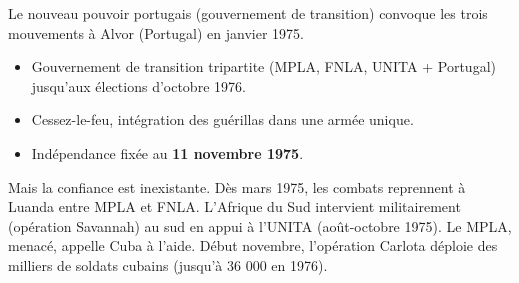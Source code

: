 \documentclass[11pt]{article}
\newcommand{\cle}[1]{{\popxbold\color{popdark}#1}}
\begin{document}
Le nouveau pouvoir portugais (gouvernement de transition) convoque les trois mouvements à \cle{Alvor} (Portugal) en janvier 1975.

\begin{propriete}
\begin{itemize}
\item Gouvernement de transition tripartite (MPLA, FNLA, UNITA + Portugal) jusqu'aux élections d'octobre 1976.
\item Cessez-le-feu, intégration des guérillas dans une armée unique.
\item Indépendance fixée au \textbf{11 novembre 1975}.
\end{itemize}
\end{propriete}

Mais la confiance est inexistante. Dès mars 1975, les combats reprennent à Luanda entre MPLA et FNLA. L'Afrique du Sud intervient militairement (opération \cle{Savannah}) au sud en appui à l'UNITA (août-octobre 1975). Le MPLA, menacé, appelle Cuba à l'aide. Début novembre, l'opération \cle{Carlota} déploie des milliers de soldats cubains (jusqu'à 36 000 en 1976).
\end{document}
